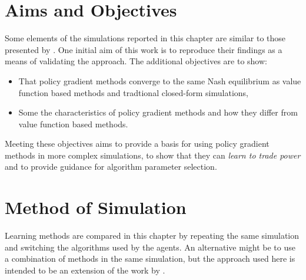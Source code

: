 \section{Aims and Objectives}
Some elements of the simulations reported in this chapter are similar to those
presented by .  One initial aim of this work is to
reproduce their findings as a means of validating the approach.  The additional
objectives are to show:
\begin{itemize}
  \item That policy gradient methods converge to the same Nash equilibrium as
  value function based methods and tradtional closed-form simulations,
  \item Some the characteristics of policy gradient methods and how they differ
  from value function based methods.
\end{itemize}
Meeting these objectives aims to provide a basis for using policy gradient
methods in more complex simulations, to show that they can \textit{learn to
trade power} and to provide guidance for algorithm parameter selection.

\section{Method of Simulation}
Learning methods are compared in this chapter by repeating the same
simulation and switching the algorithms used by the agents.  An alternative
might be to use a combination of methods in the same simulation, but the
approach used here is intended to be an extension of the work by
.

